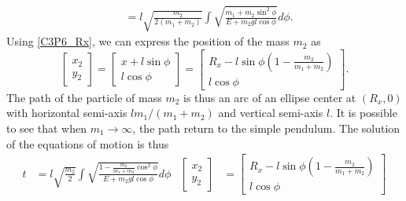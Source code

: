 \begin{problem}
{\begin{align*}
    &= l\sqrt{\frac{m_2}{2(m_1+m_2)}}\int\sqrt{\frac{m_1+m_2\sin^2{\phi}}{E+m_2gl\cos{\phi}}}d\phi.
\end{align*}
Using \eqref{C3P6_Rx}, we can express the position of the mass $m_2$ as
\begin{equation*}
    \begin{bmatrix} x_2 \\ y_2 \end{bmatrix} = \begin{bmatrix} x + l\sin{\phi} \\ l\cos{\phi} \end{bmatrix}=\begin{bmatrix} R_x - l\sin{\phi}\left(1 - \frac{m_2}{m_1+m_2} \right) \\ l\cos{\phi} \end{bmatrix} .
\end{equation*}
The path of the particle of mass $m_2$ is thus an arc of an ellipse center at $(R_x,0)$ with horizontal semi-axis $lm_1/(m_1+m_2)$ and vertical semi-axis $l$. It is possible to see that when $m_1 \rightarrow \infty$, the path return to the simple pendulum. The solution of the equations of motion is thus
}
{
\begin{align*}
  t &= l\sqrt{\frac{m_2}{2}}\int\sqrt{\frac{1-\frac{m_2}{m_1+m_2}\cos^2{\phi}}{E+m_2gl\cos{\phi}}}d\phi & \begin{bmatrix} x_2 \\ y_2 \end{bmatrix} &= \begin{bmatrix} R_x - l\sin{\phi}\left(1 - \frac{m_2}{m_1+m_2} \right) \\ l\cos{\phi} \end{bmatrix}
\end{align*}
}
\end{problem}


